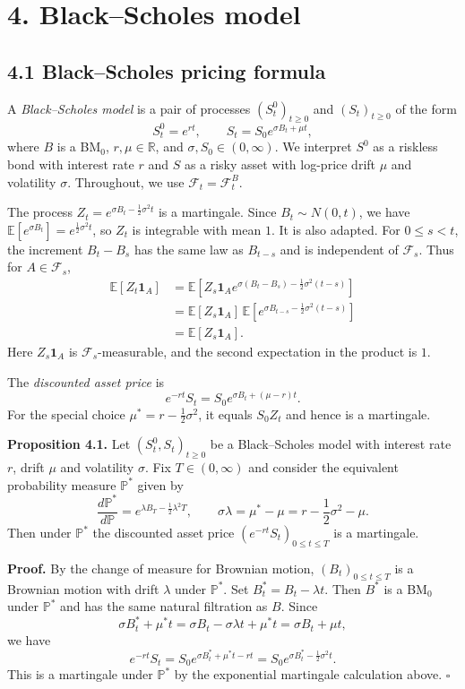 \documentclass[11pt,a4paper]{article}
\begin{document}
\section*{4. Black--Scholes model}

\subsection*{4.1 Black--Scholes pricing formula}

A \emph{Black--Scholes model} is a pair of processes $(S_t^0)_{t\geq0}$
and $(S_t)_{t\geq0}$ of the form
\[
S_t^0=e^{rt},\qquad S_t=S_0e^{\sigma B_t+\mu t},
\]
where $B$ is a BM$_0$, $r,\mu\in\mathbb R$, and
$\sigma,S_0\in(0,\infty)$. We interpret $S^0$ as a riskless bond with
interest rate $r$ and $S$ as a risky asset with log-price drift $\mu$
and volatility $\sigma$. Throughout, we use $\mathcal F_t=\mathcal F_t^B$.

The process $Z_t=e^{\sigma B_t-\frac12\sigma^2t}$ is a martingale.
Since $B_t\sim N(0,t)$, we have
$\mathbb E[e^{\sigma B_t}]=e^{\frac12\sigma^2t}$, so $Z_t$ is
integrable with mean $1$. It is also adapted. For $0\leq s<t$,
the increment $B_t-B_s$ has the same law as $B_{t-s}$ and is
independent of $\mathcal F_s$. Thus for $A\in\mathcal F_s$,
\[
\begin{aligned}
\mathbb E[Z_t\mathbf1_A]
&=\mathbb E\!\left[Z_s\mathbf1_A
   e^{\sigma(B_t-B_s)-\frac12\sigma^2(t-s)}\right]\\
&=\mathbb E[Z_s\mathbf1_A]\,
  \mathbb E\!\left[e^{\sigma B_{t-s}-\frac12\sigma^2(t-s)}\right]\\
&=\mathbb E[Z_s\mathbf1_A].
\end{aligned}
\]
Here $Z_s\mathbf1_A$ is $\mathcal F_s$-measurable, and the second
expectation in the product is $1$.

The \emph{discounted asset price} is
\[
e^{-rt}S_t=S_0e^{\sigma B_t+(\mu-r)t}.
\]
For the special choice $\mu^*=r-\frac12\sigma^2$, it equals $S_0Z_t$
and hence is a martingale.

\noindent\textbf{Proposition 4.1.}
Let $(S_t^0,S_t)_{t\geq0}$ be a Black--Scholes model with interest rate
$r$, drift $\mu$ and volatility $\sigma$. Fix $T\in(0,\infty)$ and
consider the equivalent probability measure $\mathbb P^*$ given by
\[
\frac{d\mathbb P^*}{d\mathbb P}
=e^{\lambda B_T-\frac12\lambda^2T},
\qquad
\sigma\lambda=\mu^*-\mu=r-\frac12\sigma^2-\mu.
\]
Then under $\mathbb P^*$ the discounted asset price
$(e^{-rt}S_t)_{0\leq t\leq T}$ is a martingale.

\noindent\textbf{Proof.}
By the change of measure for Brownian motion, $(B_t)_{0\leq t\leq T}$
is a Brownian motion with drift $\lambda$ under $\mathbb P^*$.
Set $B_t^*=B_t-\lambda t$. Then $B^*$ is a BM$_0$ under $\mathbb P^*$
and has the same natural filtration as $B$. Since
\[
\sigma B_t^*+\mu^*t
=\sigma B_t-\sigma\lambda t+\mu^*t
=\sigma B_t+\mu t,
\]
we have
\[
e^{-rt}S_t=S_0e^{\sigma B_t^*+\mu^*t-rt}
=S_0e^{\sigma B_t^*-\frac12\sigma^2t}.
\]
This is a martingale under $\mathbb P^*$ by the exponential martingale
calculation above. \hfill$\square$
\end{document}
